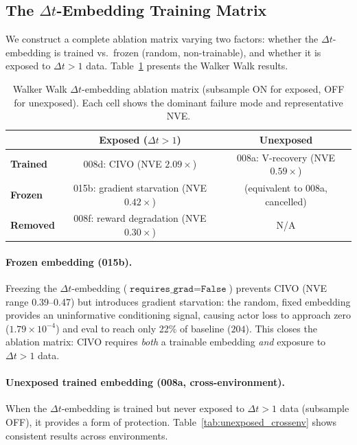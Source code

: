 \documentclass[10pt,letterpaper]{article}
\newcommand{\dt}{\Delta t}
\begin{document}
\subsection{The $\dt$-Embedding Training Matrix}
\label{sec:ablation_matrix}

We construct a complete ablation matrix varying two factors: whether the $\dt$-embedding is trained vs.\ frozen (random, non-trainable), and whether it is exposed to $\dt > 1$ data. Table~\ref{tab:ablation_matrix} presents the Walker Walk results.

\begin{table}[h]
\centering
\caption{Walker Walk $\dt$-embedding ablation matrix (subsample ON for exposed, OFF for unexposed). Each cell shows the dominant failure mode and representative NVE.}
\label{tab:ablation_matrix}
\begin{tabular}{lcc}
\toprule
& \textbf{Exposed ($\dt > 1$)} & \textbf{Unexposed} \\
\midrule
\textbf{Trained}  & 008d: CIVO (NVE $2.09\times$) & 008a: V-recovery (NVE $0.59\times$) \\
\textbf{Frozen}   & 015b: gradient starvation (NVE $0.42\times$) & (equivalent to 008a, cancelled) \\
\textbf{Removed}  & 008f: reward degradation (NVE $0.30\times$) & N/A \\
\bottomrule
\end{tabular}
\end{table}

\paragraph{Frozen embedding (015b).}
Freezing the $\dt$-embedding ($\texttt{requires\_grad}=\texttt{False}$) prevents CIVO (NVE range 0.39--0.47) but introduces gradient starvation: the random, fixed embedding provides an uninformative conditioning signal, causing actor loss to approach zero ($1.79 \times 10^{-4}$) and eval to reach only 22\% of baseline ($204$). This closes the ablation matrix: CIVO requires \emph{both} a trainable embedding \emph{and} exposure to $\dt > 1$ data.

\paragraph{Unexposed trained embedding (008a, cross-environment).}
When the $\dt$-embedding is trained but never exposed to $\dt > 1$ data (subsample OFF), it provides a form of protection. Table~\ref{tab:unexposed_crossenv} shows consistent results across environments.
\end{document}
